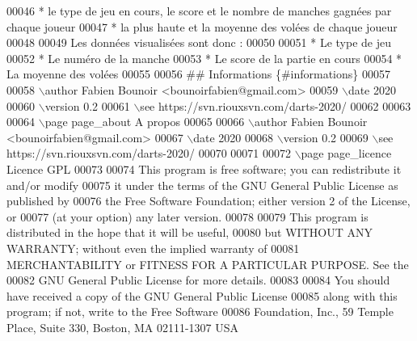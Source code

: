 \begin{DoxyCode}
00046 * le type de jeu en cours, le score et le nombre de manches gagnées par chaque joueur
00047 * la plus haute et la moyenne des volées de chaque joueur
00048 
00049 Les données visualisées sont donc :
00050 
00051 * Le type de jeu
00052 * Le numéro de la manche
00053 * Le score de la partie en cours
00054 * La moyenne des volées
00055 
00056 ## Informations \{#informations\}
00057 
00058 \(\backslash\)author Fabien Bounoir <bounoirfabien@gmail.com>
00059 \(\backslash\)date 2020
00060 \(\backslash\)version 0.2
00061 \(\backslash\)see https://svn.riouxsvn.com/darts-2020/
00062 
00063 
00064 \(\backslash\)page page\_about A propos
00065 
00066 \(\backslash\)author Fabien Bounoir <bounoirfabien@gmail.com>
00067 \(\backslash\)date 2020
00068 \(\backslash\)version 0.2
00069 \(\backslash\)see https://svn.riouxsvn.com/darts-2020/
00070 
00071 
00072 \(\backslash\)page page\_licence Licence GPL
00073 
00074 This program is free software; you can redistribute it and/or modify
00075 it under the terms of the GNU General Public License as published by
00076 the Free Software Foundation; either version 2 of the License, or
00077 (at your option) any later version.
00078 
00079 This program is distributed in the hope that it will be useful,
00080 but WITHOUT ANY WARRANTY; without even the implied warranty of
00081 MERCHANTABILITY or FITNESS FOR A PARTICULAR PURPOSE. See the
00082 GNU General Public License for more details.
00083 
00084 You should have received a copy of the GNU General Public License
00085 along with this program; if not, write to the Free Software
00086 Foundation, Inc., 59 Temple Place, Suite 330, Boston, MA 02111-1307 USA
\end{DoxyCode}
